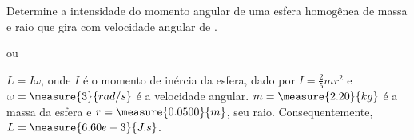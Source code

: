 \begin{question}
    Determine a intensidade do momento angular de uma esfera homogênea de massa  e raio  que gira com velocidade angular de .

    \begin{answer}
       ou 
    \end{answer}
    
    \begin{solution}
      $L = I\omega$, onde $I$ é o momento de inércia da esfera, dado por $I = \frac{2}{5}mr^2$ e $\omega = \measure{3}{rad/s}$ é a velocidade angular.
      $m = \measure{2.20}{kg}$ é a massa da esfera e $r = \measure{0.0500}{m}$, seu raio.
      Consequentemente, $L = \measure{6.60e-3}{J.s}$.
    \end{solution}
\end{question}